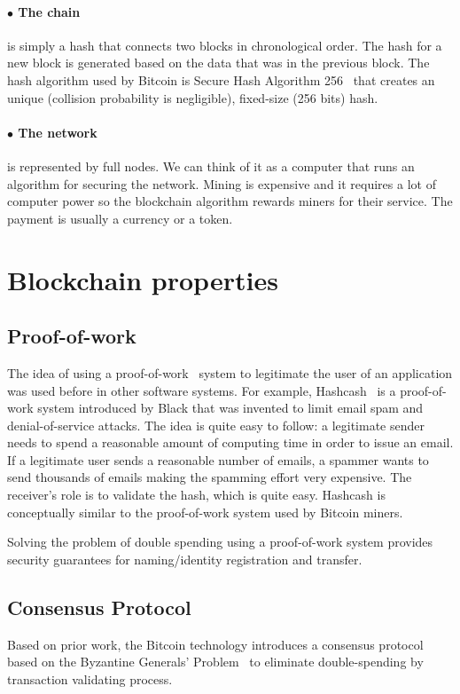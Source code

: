 \paragraph{$\bullet$ The chain}is simply a hash that connects two blocks in chronological order. The hash for a new block is generated based on the data that was in the previous block. The hash algorithm used by Bitcoin is Secure Hash Algorithm 256~\cite{sha2} that creates an unique (collision probability is negligible), fixed-size (256 bits) hash. 
\paragraph{$\bullet$ The network}is represented by full nodes. We can think of it as a computer that runs an algorithm for securing the network.
Mining is expensive and it requires a lot of computer power so the blockchain algorithm rewards miners for their service. The payment is usually a currency or a token.



\section{Blockchain properties}
\label{sec:chapter2-section2}
\subsection{Proof-of-work}
\label{subsec:proof-of-work}
The idea of using a proof-of-work~\cite{proofofwork} system to legitimate the user of an application was used before in other software systems.
For example, Hashcash~\cite{hashcash} is a proof-of-work system introduced by Black that was invented to limit email spam and denial-of-service attacks. The idea is quite easy to follow: a legitimate sender needs to spend a reasonable amount of computing time in order to issue an email. If a legitimate user sends a reasonable number of emails, a spammer wants to send thousands of emails making the spamming effort very expensive. The receiver’s role is to validate the hash, which is quite easy. Hashcash is conceptually similar to the proof-of-work system used by Bitcoin miners.

Solving the problem of double spending using a proof-of-work system provides security guarantees for naming/identity registration and transfer.

\subsection{Consensus Protocol}
\label{subsec:overview-lbl}
Based on prior work, the Bitcoin technology introduces a consensus protocol based on the Byzantine Generals’ Problem~\cite{byzantine} to eliminate double-spending by transaction validating process.

